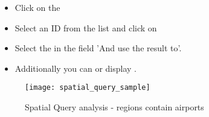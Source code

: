 \begin{itemize}[label=--]
\item Click on the 
\item Select an ID from the list and click on 
\item Select the  in the field 'And use the 
result to'.
\item Additionally you can  or display .
\end{itemize}

\begin{figure}[ht]
   \centering
   \texttt{[image: spatial\_query\_sample]}
   \caption{Spatial Query analysis - regions contain airports \nixcaption}
   \label{fig:spatialquerysample}
\end{figure}

\FloatBarrier


